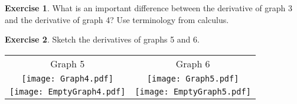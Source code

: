 \documentclass[11pt,fleqn]{article}
\theoremstyle{definition}
\newtheorem{exercise}{Exercise}
\begin{document}
\begin{exercise}  What is an important difference between the derivative of graph 3 and the derivative of graph 4? Use terminology from calculus.\end{exercise}

\vspace{.5in}

\newpage
%
\begin{exercise} Sketch the derivatives of graphs 5 and 6.\end{exercise}

\begin{tabular}{c  c}
Graph 5 & Graph 6 \\
\texttt{[image: Graph4.pdf]} &\texttt{[image: Graph5.pdf]}\\
\texttt{[image: EmptyGraph4.pdf]} &\texttt{[image: EmptyGraph5.pdf]}
\end{tabular}

 
\end{document}
